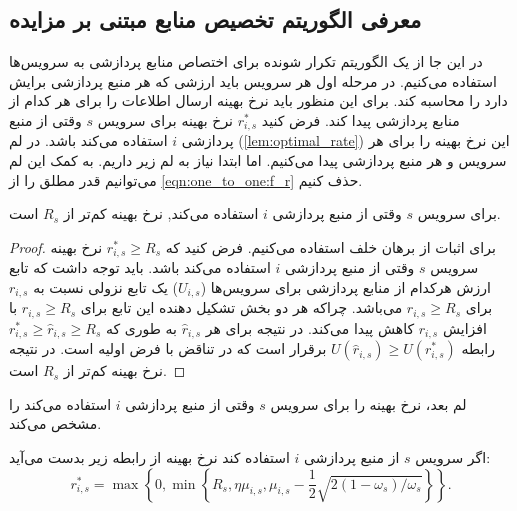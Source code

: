     \subsection{معرفی الگوریتم تخصیص منابع مبتنی بر مزایده}
      در این جا از یک الگوریتم تکرار شونده برای اختصاص منابع پردازشی به سرویس‌ها استفاده می‌کنیم.
      در مرحله اول هر سرویس باید ارزشی که هر منبع پردازشی برایش دارد را محاسبه کند.
      برای این منظور باید نرخ بهینه ارسال اطلاعات را برای هر کدام از منابع پردازشی پیدا کند.
      فرض کنید $r_{i,s}^*$ نرخ بهینه برای سرویس $s$ وقتی از منبع پردازشی $i$ استفاده می‌کند باشد.
      در لم (\ref{lem:optimal_rate}) این نرخ بهینه را برای هر سرویس و هر منبع پردازشی پیدا می‌کنیم.
      اما ابتدا نیاز به لم زیر داریم.
      به کمک این لم می‌توانیم قدر مطلق را از \cref{eqn:one_to_one:f_r} حذف کنیم.
      \begin{lemma}\label{lem:optimal_rate_positive}
        برای سرویس $s$ وقتی از منبع پردازشی $i$ استفاده می‌کند, نرخ بهینه کم‌تر از $R_s$ است.
      \end{lemma}
      \begin{proof}
        برای اثبات از برهان خلف استفاده می‌کنیم.
        فرض کنید که $r_{i,s}^* \ge R_s$ نرخ بهینه سرویس $s$ وقتی از منبع پردازشی $i$ استفاده می‌کند باشد.
        باید توجه داشت که تابع ارزش هرکدام از منابع پردازشی برای سرویس‌ها ($U_{i,s}$) یک تابع نزولی نسبت به $r_{i,s}$ برای $r_{i,s} \ge R_s$ می‌باشد.
        چراکه هر دو بخش تشکیل دهنده این تابع برای $r_{i,s} \ge R_s$ با افزایش $r_{i,s}$ کاهش پیدا می‌کند.
        در نتیجه برای هر $\hat{r}_{i,s}$ به طوری که $r_{i,s}^* \ge \hat{r}_{i,s} \ge R_s$ رابطه $U(\hat{r}_{i,s}) \ge U(r_{i,s}^*)$ برقرار است که در تناقض با فرض اولیه است.
        در نتیجه نرخ بهینه کم‌تر از $R_s$ است.
      \end{proof}
      لم بعد، نرخ بهینه را برای سرویس $s$ وقتی از منبع پردازشی $i$ استفاده می‌کند را مشخص می‌کند.
      \begin{lemma}\label{lem:optimal_rate}
        اگر سرویس $s$ از منبع پردازشی $i$ استفاده کند نرخ بهینه از رابطه زیر بدست می‌آید:
        \begin{equation}\label{eqn:optimal_rate}
          r_{i,s}^* = \max\left\{0,\min\left\{R_s, \eta \mu_{i,s}, \mu_{i,s}-\frac{1}{2}\sqrt{2(1-\omega_s)/\omega_s}\right\}\right\}.
        \end{equation}
      \end{lemma}
